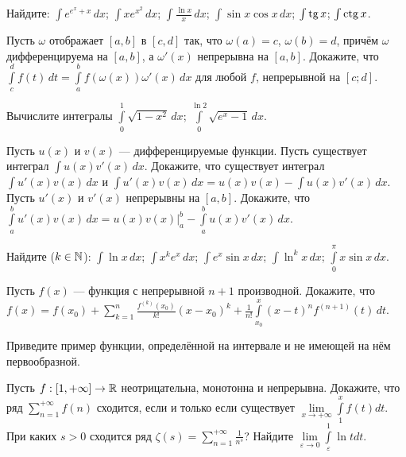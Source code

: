 \documentclass[a4paper, 11pt]{article}
\newcommand{\0}[1]{\overline{#1}}
\begin{document}
Найдите:
 $\int e^{e^x+x}\, dx$;
 $\int xe^{x^2}\, dx$;
 $\int \frac{\ln x}{x}\, dx$;
 $\int \sin x \cos x \, dx$;
 $\int\tg x $;
 $\int\ctg x $.

Пусть $\omega$ отображает $[a,b]$ в $[c,d]$ так, что $\omega(a)=c$, $\omega(b)=d$, причём $\omega$ дифференцируема на
$[a,b]$, а $\omega'(x)$ непрерывна на $[a,b]$.
Докажите, что $\int\limits_c^df(t)\, dt=
\int\limits_a^bf(\omega (x))\omega'(x)\, dx$ для любой $f$, непрерывной
на $[c;d]$.

Вычислите интегралы
$\int\limits_0^1\sqrt{1-x^2}\, dx$;
$\int\limits_0^{\ln2}\sqrt{e^x-1}\, dx$.


Пусть $u(x)$ и $v(x)$ --- дифференцируемые функции.
Пусть существует интеграл $\int u(x)v'(x)\, dx$.
Докажите, что существует интеграл $\int u'(x)v(x)\, dx$ и
$\int u'(x)v(x)\, dx=u(x)v(x)-\int u(x)v'(x)\, dx.$\\
Пусть $u'(x)$ и $v'(x)$ непрерывны на $[a,b]$. Докажите, что
$
\int\limits_a^b u'(x)v(x)\, dx=u(x)v(x)\big|^b_a-
\int\limits_a^b u(x)v'(x)\, dx.
$

Найдите ($k\in\mathbb{N}$): %
 $\int \ln x \, dx$;
 $\int x^ke^x\, dx$; %
 $\int e^x\sin x \, dx$;
 $\int \ln^k x \, dx$; %
 $\int\limits_0^\pi x\sin x\, dx$.

 Пусть $f(x)$ --- функция с непрерывной $n+1$
производной. Докажите, что
$
f(x)=f(x_0)+\sum\limits_{k=1}^n\frac{f^{(k)}(x_0)}{k!}(x-x_0)^k+
\frac{1}{n!}\int\limits_{x_0}^x(x-t)^nf^{(n+1)}(t)\, dt.
$


Приведите пример функции, определённой на интервале и не имеющей на нём первообразной.

 Пусть $f:[1,+\infty]\rightarrow \mathbb{R}$ неотрицательна, монотонна и непрерывна. Докажите, что ряд $\sum\limits_{n=1}^{+\infty}f(n)$ сходится, если и только если существует $\lim\limits_{x\to+\infty}\int\limits_1^x f(t) dt$.\\  При каких $s>0$ сходится ряд $\zeta (s)=\sum\limits_{n=1}^{+\infty}\frac1{n^s}$?  Найдите $\lim\limits_{\varepsilon\to0}\int\limits_{\varepsilon}^1 \ln t dt.$
\end{document}
